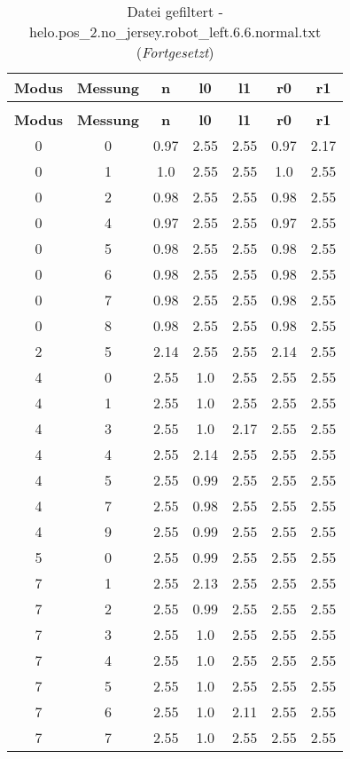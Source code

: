 \clearpage{}
\begin{longtable}{|c|c||c||c|c||c|c|}
	\caption{Datei gefiltert - helo.pos\_2.no\_jersey.robot\_left.6.6.normal.txt} \label{tab:helo.pos-2.no-jersey.robot-left.6.6.normal.txt} \\ \hline
	\textbf{Modus} & \textbf{Messung} & \textbf{n} & \textbf{l0} & \textbf{l1} & \textbf{r0} & \textbf{r1}\\ \hline
	\endfirsthead
	\caption[]{Datei gefiltert - helo.pos\_2.no\_jersey.robot\_left.6.6.normal.txt (\emph{Fortgesetzt})} \\ \hline
	\textbf{Modus} & \textbf{Messung} & \textbf{n} & \textbf{l0} & \textbf{l1} & \textbf{r0} & \textbf{r1}\\ \hline
	\endhead
	0 & 0 & 0.97 & 2.55 & 2.55 & 0.97 & 2.17 \\ \hline
	0 & 1 & 1.0 & 2.55 & 2.55 & 1.0 & 2.55 \\ \hline
	0 & 2 & 0.98 & 2.55 & 2.55 & 0.98 & 2.55 \\ \hline
	0 & 4 & 0.97 & 2.55 & 2.55 & 0.97 & 2.55 \\ \hline
	0 & 5 & 0.98 & 2.55 & 2.55 & 0.98 & 2.55 \\ \hline
	0 & 6 & 0.98 & 2.55 & 2.55 & 0.98 & 2.55 \\ \hline
	0 & 7 & 0.98 & 2.55 & 2.55 & 0.98 & 2.55 \\ \hline
	0 & 8 & 0.98 & 2.55 & 2.55 & 0.98 & 2.55 \\ \hline
	2 & 5 & 2.14 & 2.55 & 2.55 & 2.14 & 2.55 \\ \hline
	4 & 0 & 2.55 & 1.0 & 2.55 & 2.55 & 2.55 \\ \hline
	4 & 1 & 2.55 & 1.0 & 2.55 & 2.55 & 2.55 \\ \hline
	4 & 3 & 2.55 & 1.0 & 2.17 & 2.55 & 2.55 \\ \hline
	4 & 4 & 2.55 & 2.14 & 2.55 & 2.55 & 2.55 \\ \hline
	4 & 5 & 2.55 & 0.99 & 2.55 & 2.55 & 2.55 \\ \hline
	4 & 7 & 2.55 & 0.98 & 2.55 & 2.55 & 2.55 \\ \hline
	4 & 9 & 2.55 & 0.99 & 2.55 & 2.55 & 2.55 \\ \hline
	5 & 0 & 2.55 & 0.99 & 2.55 & 2.55 & 2.55 \\ \hline
	7 & 1 & 2.55 & 2.13 & 2.55 & 2.55 & 2.55 \\ \hline
	7 & 2 & 2.55 & 0.99 & 2.55 & 2.55 & 2.55 \\ \hline
	7 & 3 & 2.55 & 1.0 & 2.55 & 2.55 & 2.55 \\ \hline
	7 & 4 & 2.55 & 1.0 & 2.55 & 2.55 & 2.55 \\ \hline
	7 & 5 & 2.55 & 1.0 & 2.55 & 2.55 & 2.55 \\ \hline
	7 & 6 & 2.55 & 1.0 & 2.11 & 2.55 & 2.55 \\ \hline
	7 & 7 & 2.55 & 1.0 & 2.55 & 2.55 & 2.55 \\ \hline
\end{longtable}
